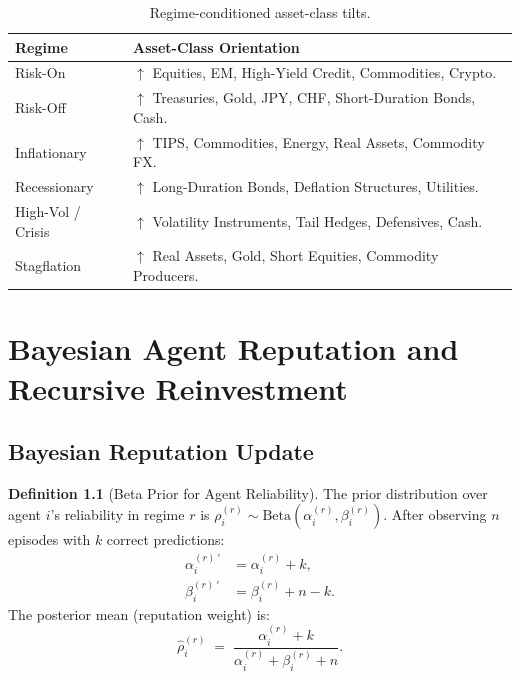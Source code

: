 \documentclass[12pt,openany]{book}
\numberwithin{equation}{chapter}
\theoremstyle{plain}
\theoremstyle{definition}
\newtheorem{definition}[theorem]{Definition}
\theoremstyle{remark}
\begin{document}
\begin{table}[H]
\centering
\caption{Regime-conditioned asset-class tilts.}
\label{tab:regime-tilts}
\small
\begin{tabularx}{\textwidth}{@{} l X @{}}
\toprule
\textbf{Regime} & \textbf{Asset-Class Orientation} \\
\midrule
Risk-On      & $\uparrow$ Equities, EM, High-Yield Credit, Commodities, Crypto. \\
Risk-Off     & $\uparrow$ Treasuries, Gold, JPY, CHF, Short-Duration Bonds, Cash. \\
Inflationary & $\uparrow$ TIPS, Commodities, Energy, Real Assets, Commodity FX. \\
Recessionary & $\uparrow$ Long-Duration Bonds, Deflation Structures, Utilities. \\
High-Vol / Crisis & $\uparrow$ Volatility Instruments, Tail Hedges, Defensives, Cash. \\
Stagflation  & $\uparrow$ Real Assets, Gold, Short Equities, Commodity Producers. \\
\bottomrule
\end{tabularx}
\end{table}

\chapter{Bayesian Agent Reputation and Recursive Reinvestment}
\label{ch:reputation}

\section{Bayesian Reputation Update}

\begin{definition}[Beta Prior for Agent Reliability]
\label{def:beta-prior}
The prior distribution over agent $i$'s reliability in regime
$r$ is $\rho_i^{(r)} \sim \mathrm{Beta}(\alpha_i^{(r)}, \beta_i^{(r)})$.
After observing $n$ episodes with $k$ correct predictions:
\begin{align}
  \alpha_i^{(r)\,\prime} &= \alpha_i^{(r)} + k, \\
  \beta_i^{(r)\,\prime}  &= \beta_i^{(r)} + n - k.
\end{align}
The posterior mean (reputation weight) is:
\begin{equation}
  \hat{\rho}_i^{(r)}
  \;=\;
  \frac{\alpha_i^{(r)} + k}
       {\alpha_i^{(r)} + \beta_i^{(r)} + n}.
  \label{eq:posterior-mean}
\end{equation}
\end{definition}
\end{document}

